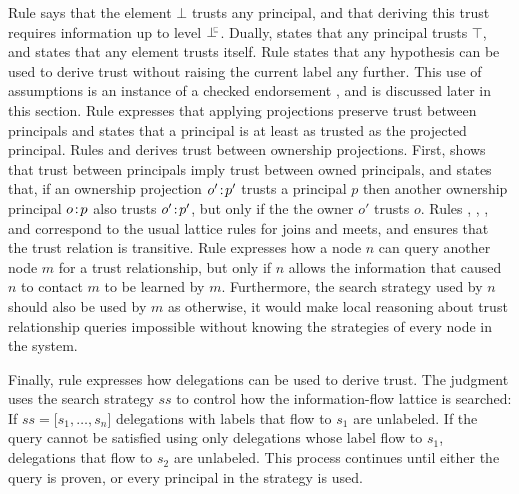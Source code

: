 Rule  says that the element $\bot$ trusts any principal, and that deriving this trust requires information up to level $\botinfoflow$. Dually,  states that any principal trusts $\top$, and  states that any element trusts itself. Rule  states that any hypothesis can be used to derive trust without raising the current label any further. This use of assumptions is an instance of a checked endorsement \cite{Chong:2007:SWA:1294261.1294265, DBLP:journals/corr/abs-1107-5594}, and is discussed later in this section. Rule  expresses that applying projections preserve trust between principals and  states that a principal is at least as trusted as the projected principal. Rules  and  derives trust between ownership projections. First,  shows that trust between principals imply trust between owned principals, and  states that, if an ownership projection $o'\!:\!p'$ trusts a principal $p$ then another ownership principal $o\!:\!p$ also trusts $o'\!:\!p'$, but only if the the owner $o'$ trusts $o$. Rules , , , and  correspond to the usual lattice rules for joins and meets, and  ensures that the trust relation is transitive. Rule  expresses how a node $n$ can query another node $m$ for a trust relationship, but only if $n$ allows the information that caused $n$ to contact $m$ to be learned by $m$. Furthermore, the search strategy used by $n$ should also be used by $m$ as otherwise, it would make local reasoning about trust relationship queries impossible without knowing the strategies of every node in the system.

Finally, rule  expresses how delegations can be used to derive trust. The judgment uses the search strategy $\mathit{ss}$ to control how the information-flow lattice is searched: If $\mathit{ss} = \lbrack s_1, \dots, s_n \rbrack$ delegations with labels that flow to $s_1$ are unlabeled. If the query cannot be satisfied using only delegations whose label flow to $s_1$, delegations that flow to $s_2$ are unlabeled. This process continues until either the query is proven, or every principal in the strategy is used.

